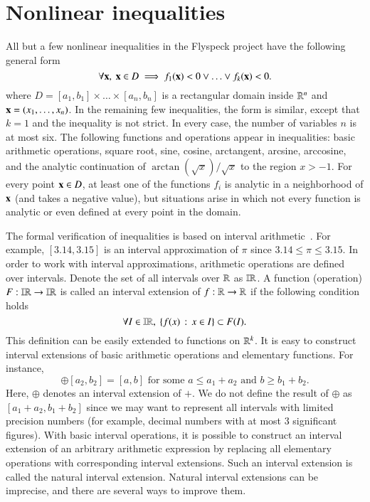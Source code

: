 \section{Nonlinear inequalities}\label{sec:ni}

All but a few nonlinear inequalities in the Flyspeck project have the
following general form
\begin{equation}\label{eqn:D}
\forall {\bf x},\ {\bf x} \in D \implies f_1({\bf x}) < 0 \vee \ldots \vee f_k({\bf x}) < 0.
\end{equation}
where $D = [a_1,b_1] \times \ldots \times [a_n, b_n]$ is a rectangular
domain inside $\mathbb{R}^n$ and ${\bf x} = (x_1,\ldots,x_n)$. In the remaining
few inequalities, the form is similar, except that $k=1$ and the
inequality is not strict.  In every case, the number of variables $n$
is at most six. The following functions and operations appear in
inequalities: basic arithmetic operations, square root, sine, cosine,
arctangent, arcsine, arccosine, and the analytic continuation of
$\arctan(\sqrt{x})/\sqrt{x}$ to the region $x > -1$.  For every point
${\bf x}\in D$, at least one of the functions $f_i$ is analytic in a
neighborhood of ${\bf x}$ (and takes a negative value), but situations
arise in which not every function is analytic or even defined at every
point in the domain.

The formal verification of inequalities is based on interval
arithmetic~\cite{moore2009introduction}.  For example, $[3.14, 3.15]$
is an interval approximation of $\pi$ since $3.14 \le \pi \le 3.15$.
In order to work with interval approximations, arithmetic operations
are defined over intervals. Denote the set of all intervals over $\mathbb{R}$
as $\mathbb{IR}$. A function (operation) $F:\mathbb{IR} \to \mathbb{IR}$ is called an interval
extension of $f:\mathbb{R} \to \mathbb{R}$ if the following condition holds
\begin{equation*}
\forall I \in \mathbb{IR},\ \{ f(x)\,:\,x \in I \} \subset F(I).
\end{equation*}
This definition can be easily extended to functions on $\mathbb{R}^k$. It is
easy to construct interval extensions of basic arithmetic operations
and elementary functions. For instance,
\begin{equation*}
[a_1,b_1] \oplus [a_2,b_2]= [a, b] \text { for some $a \le a_1 + a_2$ and $b \ge b_1 + b_2$}.
\end{equation*}
Here, $\oplus$ denotes an interval extension of $+$. We do not define
the result of $\oplus$ as $[a_1 + a_2, b_1 + b_2]$ since we may want
to represent all intervals with limited precision numbers (for
example, decimal numbers with at most 3 significant figures). With
basic interval operations, it is possible to construct an interval
extension of an arbitrary arithmetic expression by replacing all
elementary operations with corresponding interval extensions. Such an
interval extension is called the natural interval extension. Natural
interval extensions can be imprecise, and there are several ways to
improve them. 

